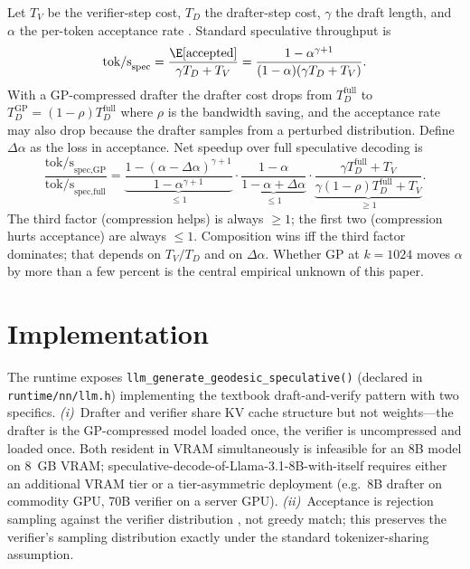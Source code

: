 \documentclass[11pt]{article}
\begin{document}
Let $T_V$ be the verifier-step cost, $T_D$ the drafter-step cost, $\gamma$
the draft length, and $\alpha$ the per-token acceptance rate
\cite{leviathan2023speculative}.  Standard speculative throughput is
\begin{equation}
\label{eq:spec}
\text{tok/s}_\text{spec}
= \frac{\E[\text{accepted}]}{\gamma T_D + T_V}
= \frac{1-\alpha^{\gamma+1}}{(1-\alpha)(\gamma T_D+T_V)}.
\end{equation}
With a GP-compressed drafter the drafter cost drops from
$T_D^\text{full}$ to $T_D^\text{GP}=(1-\rho)T_D^\text{full}$ where
$\rho$ is the bandwidth saving, and the acceptance rate may also drop
because the drafter samples from a perturbed distribution.  Define
$\Delta\alpha$ as the loss in acceptance.  Net speedup over full
speculative decoding is
\begin{equation}
\label{eq:netspeedup}
\frac{\text{tok/s}_\text{spec,GP}}{\text{tok/s}_\text{spec,full}}
=
\underbrace{\frac{1-(\alpha-\Delta\alpha)^{\gamma+1}}{1-\alpha^{\gamma+1}}}_{\leq 1}
\cdot
\underbrace{\frac{1-\alpha}{1-\alpha+\Delta\alpha}}_{\leq 1}
\cdot
\underbrace{\frac{\gamma T_D^\text{full}+T_V}{\gamma(1-\rho)T_D^\text{full}+T_V}}_{\geq 1}.
\end{equation}
The third factor (compression helps) is always $\geq 1$; the first two
(compression hurts acceptance) are always $\leq 1$.  Composition wins iff
the third factor dominates; that depends on $T_V/T_D$ and on $\Delta\alpha$.
Whether GP at $k{=}1024$ moves $\alpha$ by more than a few percent is the
central empirical unknown of this paper.

\section{Implementation}
The runtime exposes
\texttt{llm\_generate\_geodesic\_speculative()} (declared in
\texttt{runtime/nn/llm.h}) implementing the textbook draft-and-verify
pattern with two specifics.  \emph{(i)}~Drafter and verifier share KV
cache structure but not weights---the drafter is the GP-compressed
model loaded once, the verifier is uncompressed and loaded once.  Both
resident in VRAM simultaneously is infeasible for an 8B model on 8~GB
VRAM; speculative-decode-of-Llama-3.1-8B-with-itself requires either an
additional VRAM tier or a tier-asymmetric deployment (e.g.\ 8B drafter
on commodity GPU, 70B verifier on a server GPU).  \emph{(ii)}~Acceptance
is rejection sampling against the verifier distribution
\cite{leviathan2023speculative,chen2023speculative}, not greedy match;
this preserves the verifier's sampling distribution exactly under the
standard tokenizer-sharing assumption.
\end{document}

